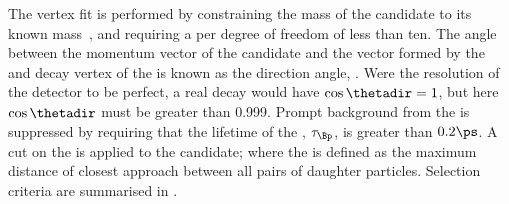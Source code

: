 The \Bp vertex fit is performed by constraining the mass of the \Ds candidate to its known
mass~\cite{PDG2012}, and requiring a \chisqvtx per degree of freedom of
less than ten.
The angle between the momentum vector of the \Bp candidate and
the vector formed by the \pv and decay vertex of the \Bp is known as the direction angle,
\thetadir.
Were the resolution of the \lhcb detector to be perfect, a real decay would have $\cos\thetadir=1$,
but here $\cos\thetadir$ must be greater than 0.999.
Prompt background from the \pv is suppressed by requiring that the lifetime of the \Bp,
$\tau_{\Bp}$, is greater than $0.2\ps$.
A cut on the \DOCA is applied to the \Ds candidate; where the \DOCA is defined as the maximum
distance of closest approach between all pairs of daughter particles.
Selection criteria are summarised in .



